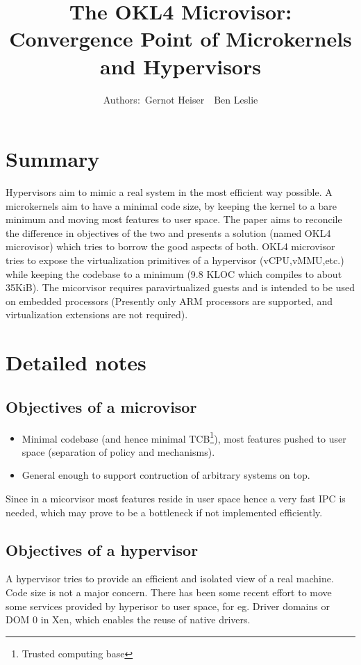 \documentclass[a4paper,10pt]{article}
\title{The OKL4 Microvisor:\\Convergence Point of Microkernels and Hypervisors}
\author{Authors:\	Gernot Heiser\	\	Ben Leslie}
\date{}
\begin{document}
\maketitle


\section{Summary}
Hypervisors aim to mimic a real system in the most efficient way possible. A microkernels aim to have a minimal code size, by keeping the kernel to a bare minimum and moving most features to user space.
The paper aims to reconcile the difference in objectives of the two and presents a solution (named OKL4 microvisor) which tries to borrow the good aspects of both.
OKL4 microvisor tries to expose the virtualization primitives of a hypervisor (vCPU,vMMU,etc.) while keeping the codebase to a minimum (9.8 KLOC which compiles to about 35KiB).
The micorvisor requires paravirtualized guests and is intended to be used on embedded processors (Presently only ARM processors are supported, and virtualization extensions are not required).

\section{Detailed notes}
\subsection*{Objectives of a microvisor}
\begin{itemize}
 \item Minimal codebase (and hence minimal TCB\footnote{Trusted computing base}), most features pushed to user space (separation of policy and mechanisms).
 \item General enough to support contruction of arbitrary systems on top.
\end{itemize}
Since in a micorvisor most features reside in user space hence a very fast IPC is needed, which may prove to be a bottleneck if not implemented efficiently. 

\subsection*{Objectives of a hypervisor}
A hypervisor tries to provide an efficient and isolated view of a real machine. Code size is not a major concern. There has been some recent effort to move some services provided by hyperisor to user space, for eg. Driver domains or DOM 0 in Xen, which enables the reuse of native drivers.
\end{document}
